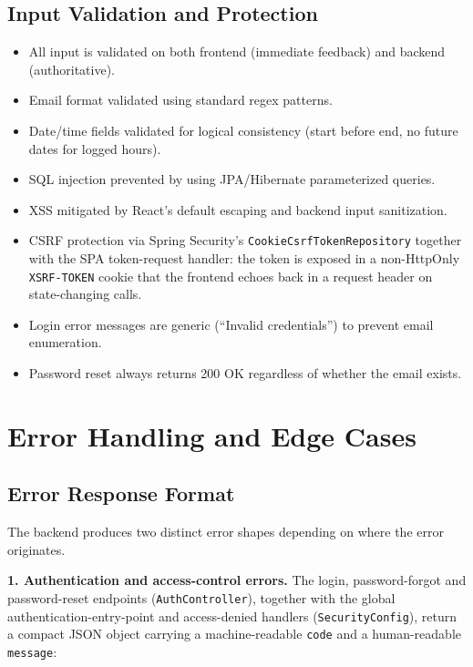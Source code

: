 \documentclass[11pt,a4paper]{article}
\begin{document}
\subsection{Input Validation and Protection}

\begin{itemize}[leftmargin=1.5em]
    \item All input is validated on both frontend (immediate feedback) and backend (authoritative).
    \item Email format validated using standard regex patterns.
    \item Date/time fields validated for logical consistency (start before end, no future dates for logged hours).
    \item SQL injection prevented by using JPA/Hibernate parameterized queries.
    \item XSS mitigated by React's default escaping and backend input sanitization.
    \item CSRF protection via Spring Security's \texttt{CookieCsrfTokenRepository} together with the SPA token-request handler: the token is exposed in a non-HttpOnly \texttt{XSRF-TOKEN} cookie that the frontend echoes back in a request header on state-changing calls.
    \item Login error messages are generic (``Invalid credentials'') to prevent email enumeration.
    \item Password reset always returns 200 OK regardless of whether the email exists.
\end{itemize}

\section{Error Handling and Edge Cases}
\label{sec:errors}

\subsection{Error Response Format}

The backend produces two distinct error shapes depending on where the error originates.

\textbf{1. Authentication and access-control errors.} The login, password-forgot and
password-reset endpoints (\texttt{AuthController}), together with the global
authentication-entry-point and access-denied handlers (\texttt{SecurityConfig}), return a
compact JSON object carrying a machine-readable \texttt{code} and a human-readable
\texttt{message}:
\end{document}
